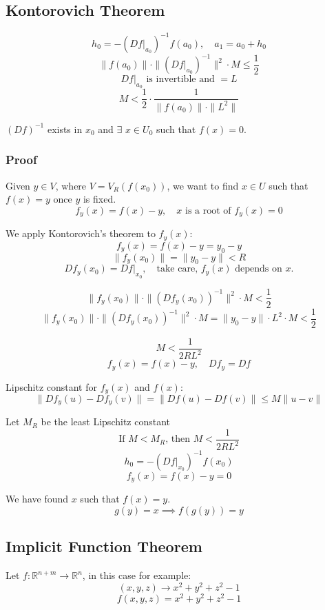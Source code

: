 \documentclass[11pt]{article}
\begin{document}
\subsection{Kontorovich Theorem}
\[
h_0 = - (Df\big|_{a_0})^{-1} f(a_0), \quad a_1 = a_0 + h_0
\]
\[
\|f(a_0)\| \cdot \| (Df\big|_{a_0})^{-1} \|^2 \cdot M \leq \frac{1}{2}
\]
\[
Df\big|_{a_0} \text{ is invertible and } = L
\]
\[
M < \frac{1}{2} \cdot \frac{1}{\|f(a_0)\| \cdot \|L^{2}\|}
\]

$(Df)^{-1}$ exists in $x_0$ and $\exists$ $x \in U_0$ such that $f(x) = 0$.

\subsubsection{Proof}
Given $y \in V$, where $V = V_R(f(x_0))$, we want to find $x \in U$ such that $f(x) = y$ once $y$ is fixed.
\[
f_y(x) = f(x) - y, \quad x \text{ is a root of } f_y(x) = 0
\]

We apply Kontorovich's theorem to $f_y(x)$:
\[
f_y(x) = f(x) - y = y_0 - y
\]
\[
\|f_y(x_0)\| = \|y_0 - y\| < R
\]
\[
Df_y(x_0) = Df\big|_{x_0}, \quad \text{take care, } f_y(x) \text{ depends on } x.
\]

\[
\|f_y(x_0)\| \cdot \|(Df_y(x_0))^{-1}\|^2 \cdot M < \frac{1}{2}
\]
\[
\|f_y(x_0)\| \cdot \|(Df_y(x_0))^{-1}\|^2 \cdot M = \|y_0 - y\| \cdot L^2 \cdot M < \frac{1}{2}
\]

\[
M < \frac{1}{2RL^2}
\]
\[
f_y(x) = f(x) - y, \quad Df_y = Df
\]

Lipschitz constant for $f_y(x)$ and $f(x)$:
\[
\|Df_y(u) - Df_y(v)\| = \|Df(u) - Df(v)\| \leq M \|u - v\|
\]

Let $M_R$ be the least Lipschitz constant
\[
\text{If } M < M_R \text{, then } M < \frac{1}{2RL^2}
\]
\[
h_0 = - (Df\big|_{x_0})^{-1} f(x_0)
\]
\[
f_y(x) = f(x) - y = 0
\]

We have found $x$ such that $f(x) = y$.
\[
g(y) = x \implies f(g(y)) = y
\]

\subsection{Implicit Function Theorem}
Let $f : \mathbb{R}^{n+m} \rightarrow \mathbb{R}^n$, in this case for example:
\[
(x,y,z) \rightarrow x^2 + y^2 + z^2 - 1
\]
\[
f(x,y,z) = x^2 + y^2 + z^2 - 1
\]
\end{document}

